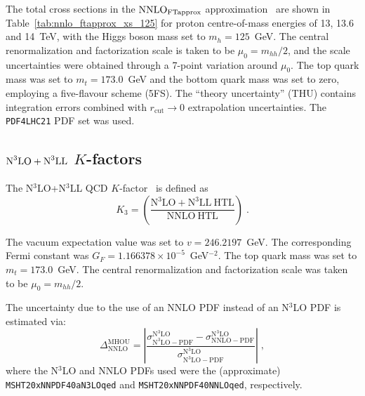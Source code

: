 The total cross sections in the $\textup{NNLO}_{\textup{FTapprox}}$ approximation~\cite{Grazzini:2018bsd} are shown in Table~\ref{tab:nnlo_ftapprox_xs_125} for proton centre-of-mass energies of 13, 13.6 and 14~TeV, with the Higgs boson mass set to $m_h = 125$~GeV. The central renormalization and factorization scale is taken to be $\mu_0  = m_{hh}/2$, and the scale uncertainties were obtained through a 7-point variation around $\mu_0$.
The top quark mass was set to $m_t=173.0$~GeV and the bottom quark mass was set to zero, employing a five-flavour scheme (5FS). The ``theory uncertainty'' (THU) contains integration errors combined with $r_\mathrm{cut}\rightarrow 0$ extrapolation uncertainties. The \texttt{PDF4LHC21} PDF set was used.

\subsection[\texorpdfstring{$\textup{N}^3\textup{LO}+\textup{N}^3\textup{LL}$ $K$-factors}{N3LO+N3LL K-factors}]{\texorpdfstring{\boldmath$\textup{N}^3\textup{LO}+\textup{N}^3\textup{LL}$ $K$-factors}{N3LO+N3LL K-factors}}

The N$^3$LO+N$^3$LL QCD $K$-factor~\cite{Chen:2019lzz,Ajjath:2022kpv} is defined as
\begin{equation}\label{eq:n3lokfac}
K_3 = \left(\frac{\mathrm{N^3LO+N^3LL~HTL} }{\mathrm{NNLO~HTL}}\right)\;.
\end{equation}

\begin{sloppypar}
The vacuum expectation value was set to $v=246.2197$~GeV. The corresponding Fermi constant was $G_F = 1.166378 \times 10^{-5}$~GeV$^{-2}$. The top quark mass was set to $m_t=173.0$~GeV. The central renormalization and factorization scale was taken to be $\mu_0  = m_{hh}/2$.
\end{sloppypar}

The uncertainty due to the use of an NNLO PDF instead of an N$^3$LO PDF is estimated via: 
\begin{equation}
 \Delta ^{\mathrm{MHOU}}_\mathrm{NNLO} =  \left| \frac { \sigma^{\mathrm{N}^3\mathrm{LO}}_{\mathrm{N}^3\mathrm{LO-PDF}} - \sigma^{\mathrm{N}^3\mathrm{LO}}_{\mathrm{NNLO-PDF}} } { \sigma^{\mathrm{N}^3\mathrm{LO}}_{\mathrm{N}^3\mathrm{LO-PDF}}  }  \right|\;,
 \label{eq:deltan3lopdf}
\end{equation}
where the N$^3$LO and NNLO PDFs used were the (approximate) \texttt{MSHT20xNNPDF40\ttus aN3LO\ttus qed} and \texttt{MSHT20xNNPDF40\ttus NNLO\ttus qed}, respectively.

